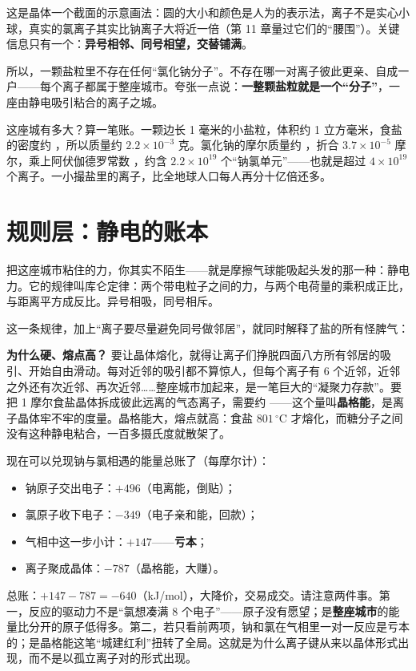 这是晶体一个截面的示意画法：圆的大小和颜色是人为的表示法，离子不是实心小球，真实的氯离子其实比钠离子大将近一倍（第 11 章量过它们的“腰围”）。关键信息只有一个：\textbf{异号相邻、同号相望，交替铺满}。

所以，一颗盐粒里不存在任何“氯化钠分子”。不存在哪一对离子彼此更亲、自成一户——每个离子都属于整座城市。夸张一点说：\textbf{一整颗盐粒就是一个“分子”}，一座由静电吸引粘合的离子之城。

这座城有多大？算一笔账。一颗边长 1 毫米的小盐粒，体积约 1 立方毫米，食盐的密度约 ，所以质量约 $2.2\times 10^{-3}$ 克。氯化钠的摩尔质量约 ，折合 $3.7\times 10^{-5}$ 摩尔，乘上阿伏伽德罗常数 ，约含 $2.2\times 10^{19}$ 个“钠氯单元”——也就是超过 $4\times 10^{19}$ 个离子。一小撮盐里的离子，比全地球人口每人再分十亿倍还多。

\section{规则层：静电的账本}

把这座城市粘住的力，你其实不陌生——就是摩擦气球能吸起头发的那一种：静电力。它的规律叫库仑定律：两个带电粒子之间的力，与两个电荷量的乘积成正比，与距离平方成反比。异号相吸，同号相斥。

这一条规律，加上“离子要尽量避免同号做邻居”，就同时解释了盐的所有怪脾气：

\textbf{为什么硬、熔点高？} 要让晶体熔化，就得让离子们挣脱四面八方所有邻居的吸引、开始自由滑动。每对近邻的吸引都不算惊人，但每个离子有 6 个近邻，近邻之外还有次近邻、再次近邻……整座城市加起来，是一笔巨大的“凝聚力存款”。要把 1 摩尔食盐晶体拆成彼此远离的气态离子，需要约 ——这个量叫\textbf{晶格能}，是离子晶体牢不牢的度量。晶格能大，熔点就高：食盐 $801\,^{\circ}\mathrm{C}$ 才熔化，而糖分子之间没有这种静电粘合，一百多摄氏度就散架了。

\begin{qiaoliang}
现在可以兑现钠与氯相遇的能量总账了（每摩尔计）：
\begin{itemize}[itemsep=1pt]
\item 钠原子交出电子：$+496$（电离能，倒贴）；
\item 氯原子收下电子：$-349$（电子亲和能，回款）；
\item 气相中这一步小计：$+147$——\textbf{亏本}；
\item 离子聚成晶体：$-787$（晶格能，大赚）。
\end{itemize}
总账：$+147-787=-640$（kJ/mol），大降价，交易成交。请注意两件事。第一，反应的驱动力不是“氯想凑满 8 个电子”——原子没有愿望；是\textbf{整座城市}的能量比分开的原子低得多。第二，若只看前两项，钠和氯在气相里一对一反应是亏本的；是晶格能这笔“城建红利”扭转了全局。这就是为什么离子键从来以晶体形式出现，而不是以孤立离子对的形式出现。
\end{qiaoliang}

